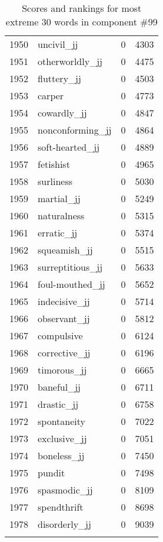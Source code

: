 \begin{longtable}[!htbp]{| rlr@{.}l |}
    1950 & uncivil\_jj & 0 & 4303 \\
    1951 & otherworldly\_jj & 0 & 4475 \\
    1952 & fluttery\_jj & 0 & 4503 \\
    1953 & carper & 0 & 4773 \\
    1954 & cowardly\_jj & 0 & 4847 \\
    1955 & nonconforming\_jj & 0 & 4864 \\
    1956 & soft-hearted\_jj & 0 & 4889 \\
    1957 & fetishist & 0 & 4965 \\
    1958 & surliness & 0 & 5030 \\
    1959 & martial\_jj & 0 & 5249 \\
    1960 & naturalness & 0 & 5315 \\
    1961 & erratic\_jj & 0 & 5374 \\
    1962 & squeamish\_jj & 0 & 5515 \\
    1963 & surreptitious\_jj & 0 & 5633 \\
    1964 & foul-mouthed\_jj & 0 & 5652 \\
    1965 & indecisive\_jj & 0 & 5714 \\
    1966 & observant\_jj & 0 & 5812 \\
    1967 & compulsive & 0 & 6124 \\
    1968 & corrective\_jj & 0 & 6196 \\
    1969 & timorous\_jj & 0 & 6665 \\
    1970 & baneful\_jj & 0 & 6711 \\
    1971 & drastic\_jj & 0 & 6758 \\
    1972 & spontaneity & 0 & 7022 \\
    1973 & exclusive\_jj & 0 & 7051 \\
    1974 & boneless\_jj & 0 & 7450 \\
    1975 & pundit & 0 & 7498 \\
    1976 & spasmodic\_jj & 0 & 8109 \\
    1977 & spendthrift & 0 & 8698 \\
    1978 & disorderly\_jj & 0 & 9039 \\
    \hline
    \caption{Scores and rankings for most extreme 30 words in component \#99} \\
\end{longtable}
